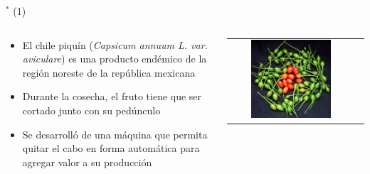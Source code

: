 
\begin{frame}{$^*$  (1)}

\begin{columns}
\begin{column}{0.70\textwidth}
	\begin{itemize}
		\item El chile piquín (\textit{Capsicum annuum L. var. aviculare}) es una producto endémico de la región noreste de la república mexicana
        \item Durante la cosecha, el fruto tiene que ser cortado junto con su pedúnculo
        \item Se desarrolló de una máquina que permita quitar el cabo en forma automática para agregar valor a su producción
	\end{itemize}
\end{column}
\begin{column}{0.30\textwidth}  
\begin{center}
     \begin{tabular}{cc}
         \includegraphics[width=0.68\textwidth]{2022_MaquinaChilePiquin/figs/TeSientas.png}\\         
      \end{tabular}
\end{center}
\end{column} 
\end{columns} 


\end{frame}


